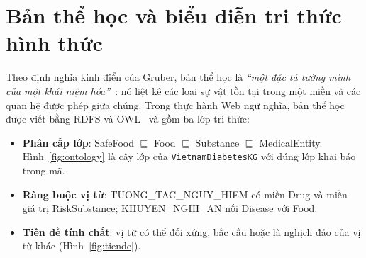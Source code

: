 
\section{Bản thể học và biểu diễn tri thức hình thức}
Theo định nghĩa kinh điển của Gruber, bản thể học là \emph{``một đặc tả tường minh của một khái niệm
hóa''}~\cite{gruber1993ontology}: nó liệt kê các loại sự vật tồn tại trong một miền và các quan hệ được phép giữa
chúng. Trong thực hành Web ngữ nghĩa, bản thể học được viết bằng RDFS và OWL~\cite{w3c2012owl} và gồm ba lớp
tri thức:

\begin{itemize}
  \item \textbf{Phân cấp lớp}: \textsf{SafeFood} $\sqsubseteq$ \textsf{Food} $\sqsubseteq$ \textsf{Substance}
        $\sqsubseteq$ \textsf{MedicalEntity}. Hình~\ref{fig:ontology} là cây lớp của \texttt{VietnamDiabetesKG}
        với đúng  lớp khai báo trong mã.
  \item \textbf{Ràng buộc vị từ}: \textsf{TUONG\_TAC\_NGUY\_HIEM} có miền \textsf{Drug} và miền giá trị
        \textsf{RiskSubstance}; \textsf{KHUYEN\_NGHI\_AN} nối \textsf{Disease} với \textsf{Food}.
  \item \textbf{Tiên đề tính chất}: vị từ có thể đối xứng, bắc cầu hoặc là nghịch đảo của vị từ khác
        (Hình~\ref{fig:tiende}).
\end{itemize}



